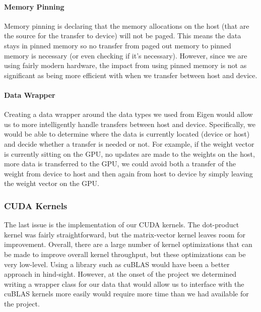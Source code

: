 \documentclass{article}
\begin{document}
\paragraph{Memory Pinning} Memory pinning is declaring that the memory
allocations on the host (that are the source for the transfer to device) will
not be paged. This means the data stays in pinned memory so no transfer from
paged out memory to pinned memory is necessary (or even checking if it's
necessary). However, since we are using fairly modern hardware, the impact from
using pinned memory is not as significant as being more efficient with when we
transfer between host and device.

\paragraph{Data Wrapper} Creating a data wrapper around the data types we used
from Eigen would allow us to more intelligently handle transfers between host
and device. Specifically, we would be able to determine where the data is
currently located (device or host) and decide whether a transfer is needed or
not. For example, if the weight vector is currently sitting on the GPU, no
updates are made to the weights on the host, more data is transferred to the
GPU, we could avoid both a transfer of the weight from device to host and then
again from host to device by simply leaving the weight vector on the GPU.

\subsubsection{CUDA Kernels}
The last issue is the implementation of our CUDA kernels. The dot-product
kernel was fairly straightforward, but the matrix-vector kernel leaves room for
improvement. Overall, there are a large number of kernel optimizations that can
be made to improve overall kernel throughput, but these optimizations can be
very low-level. Using a library such as cuBLAS would have been a better
approach in hind-sight. However, at the onset of the project we determined
writing a wrapper class for our data that would allow us to interface with the
cuBLAS kernels more easily would require more time than we had available for
the project.
\end{document}
